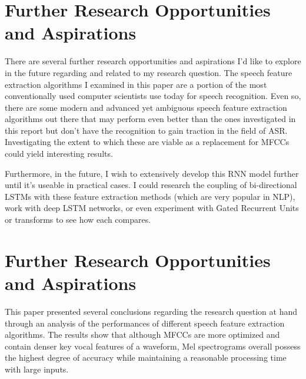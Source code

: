 
\section{Further Research Opportunities and Aspirations}

There are several further research opportunities and aspirations I’d like to explore in the future regarding and related to my research question. The speech feature extraction algorithms I examined in this paper are a portion of the most conventionally used computer scientists use today for speech recognition. Even so, there are some modern and advanced yet ambiguous speech feature extraction algorithms out there that may perform even better than the ones investigated in this report but don’t have the recognition to gain traction in the field of ASR. Investigating the extent to which these are viable as a replacement for MFCCs could yield interesting results. 
\newline\par
Furthermore, in the future, I wish to extensively develop this RNN model further until it’s useable in practical cases. I could research the coupling of bi-directional LSTMs with these feature extraction methods (which are very popular in NLP), work with deep LSTM networks, or even experiment with Gated Recurrent Units or transforms to see how each compares.


\section{Further Research Opportunities and Aspirations}

This paper presented several conclusions regarding the research question at hand through an analysis of the performances of different speech feature extraction algorithms. The results show that although MFCCs are more optimized and contain denser key vocal features of a waveform, Mel spectrograms overall possess the highest degree of accuracy while maintaining a reasonable processing time with large inputs.